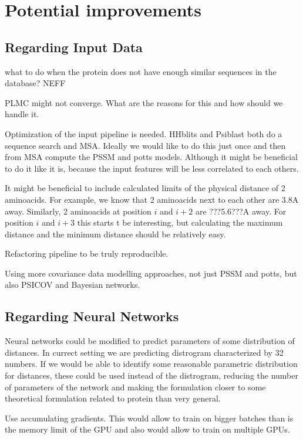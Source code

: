 \section{Potential improvements}

\subsection{Regarding Input Data}
what to do when the protein does not have enough similar sequences in the database?
NEFF

PLMC might not converge. What are the reasons for this and how should we handle it.

Optimization of the input pipeline is needed.
HHblits and Psiblast both do a sequence search and MSA.
Ideally we would like to do this just once and then from MSA compute the PSSM and potts models.
Although it might be beneficial to do it like it is, because the input features will be less correlated to each others.

It might be beneficial to include calculated limits of the physical distance of 2 aminoacids.
For example, we know that 2 aminoacids next to each other are 3.8A away.
Similarly, 2 aminoacids at position $i$ and $i+2$ are ???5.6???A away.
For position $i$ and $i+3$ this starts t be interesting, but calculating the maximum distance and the minimum distance should be relatively easy.

Refactoring pipeline to be truly reproducible.

Using more covariance data modelling approaches, not just PSSM and potts, but also PSICOV and Bayesian networks.

\subsection{Regarding Neural Networks}
Neural networks could be modified to predict parameters of some distribution of distances.
In currect setting we are predicting distrogram characterized by 32 numbers.
If we would be able to identify some reasonable parametric distribution for distances, these could be used instead of the distrogram, reducing the number of parameters of the network and making the formulation closer to some theoretical formulation related to protein than very general.

Use accumulating gradients. This would allow to train on bigger batches than is the memory limit of the GPU and also would allow to train on multiple GPUs.

